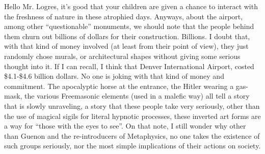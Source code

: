 \begin{footnotesize}
\begin{sffamily}
Hello Mr. Logres, it's good that your children are given a chance to interact with the freshness of nature in these atrophied days. Anyways, about the airport, among other ``questionable'' monuments, we should note that the people behind them churn out billions of dollars for their construction. Billions. I doubt that, with that kind of money involved (at least from their point of view), they just randomly chose murals, or architectural shapes without giving some serious thought into it. If I can recall, I think that Denver International Airport, costed \$4.1-\$4.6 billion dollars. No one is joking with that kind of money and commitment. The apocalyptic horse at the entrance, the Hitler wearing a gas-mask, the various Freemasonic elements (used in a malefic way) all tell a story that is slowly unraveling, a story that these people take very seriously, other than the use of magical sigils for literal hypnotic processes, these inverted art forms are a way for ``those with the eyes to see''. On that note, I still wonder why other than Guenon and the re-introducers of Metaphysics, no one takes the existence of such groups seriously, nor the most simple implications of their actions on society.

\hfill

\end{sffamily}
\end{footnotesize}

